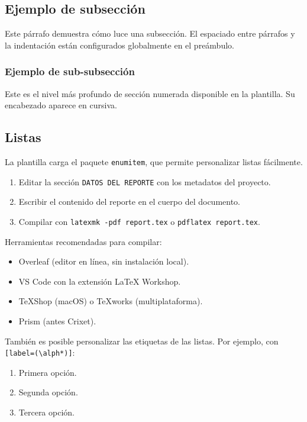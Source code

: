 \documentclass[letterpaper, 11pt]{article}
\begin{document}
\subsection{Ejemplo de subsección}

Este párrafo demuestra cómo luce una subsección. El espaciado entre
párrafos y la indentación están configurados globalmente en el
preámbulo.

\subsubsection{Ejemplo de sub-subsección}

Este es el nivel más profundo de sección numerada disponible en la
plantilla. Su encabezado aparece en cursiva.

\subsection{Listas}

La plantilla carga el paquete \texttt{enumitem}, que permite
personalizar listas fácilmente.

\begin{enumerate}
    \item Editar la sección \texttt{DATOS DEL REPORTE} con los metadatos del proyecto.
    \item Escribir el contenido del reporte en el cuerpo del documento.
    \item Compilar con \texttt{latexmk -pdf report.tex} o \texttt{pdflatex report.tex}.
\end{enumerate}

Herramientas recomendadas para compilar:

\begin{itemize}
    \item Overleaf (editor en línea, sin instalación local).
    \item VS Code con la extensión LaTeX Workshop.
    \item TeXShop (macOS) o TeXworks (multiplataforma).
    \item Prism (antes Crixet).
\end{itemize}

También es posible personalizar las etiquetas de las listas. Por
ejemplo, con \verb|[label=(\alph*)]|:

\begin{enumerate}[label=(\alph*)]
    \item Primera opción.
    \item Segunda opción.
    \item Tercera opción.
\end{enumerate}
\end{document}
